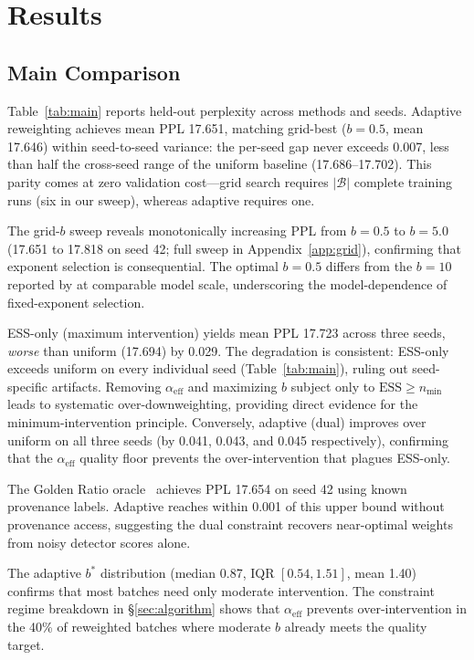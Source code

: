 \section{Results}
\label{sec:results}

\subsection{Main Comparison}

Table~\ref{tab:main} reports held-out perplexity across methods and seeds.
Adaptive reweighting achieves mean PPL 17.651, matching grid-best ($b{=}0.5$, mean 17.646) within seed-to-seed variance: the per-seed gap never exceeds 0.007, less than half the cross-seed range of the uniform baseline (17.686--17.702).
This parity comes at zero validation cost---grid search requires $|\mathcal{B}|$ complete training runs (six in our sweep), whereas adaptive requires one.

The grid-$b$ sweep reveals monotonically increasing PPL from $b{=}0.5$ to $b{=}5.0$ (17.651 to 17.818 on seed 42; full sweep in Appendix~\ref{app:grid}), confirming that exponent selection is consequential.
The optimal $b{=}0.5$ differs from the $b{=}10$ reported by \citet{drayson_2025_detection_collapse} at comparable model scale, underscoring the model-dependence of fixed-exponent selection.

ESS-only (maximum intervention) yields mean PPL 17.723 across three seeds, \emph{worse} than uniform (17.694) by 0.029.
The degradation is consistent: ESS-only exceeds uniform on every individual seed (Table~\ref{tab:main}), ruling out seed-specific artifacts.
Removing $\alpha_{\mathrm{eff}}$ and maximizing $b$ subject only to $\mathrm{ESS} \geq n_{\min}$ leads to systematic over-downweighting, providing direct evidence for the minimum-intervention principle.
Conversely, adaptive (dual) improves over uniform on all three seeds (by 0.041, 0.043, and 0.045 respectively), confirming that the $\alpha_{\mathrm{eff}}$ quality floor prevents the over-intervention that plagues ESS-only.

The Golden Ratio oracle~\citep{he_2025_golden_ratio} achieves PPL 17.654 on seed 42 using known provenance labels.
Adaptive reaches within 0.001 of this upper bound without provenance access, suggesting the dual constraint recovers near-optimal weights from noisy detector scores alone.

The adaptive $b^*$ distribution (median 0.87, IQR $[0.54, 1.51]$, mean 1.40) confirms that most batches need only moderate intervention.
The constraint regime breakdown in \S\ref{sec:algorithm} shows that $\alpha_{\mathrm{eff}}$ prevents over-intervention in the 40\% of reweighted batches where moderate $b$ already meets the quality target.

